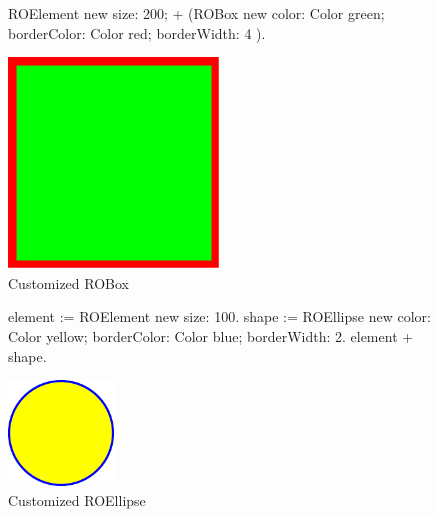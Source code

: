 \documentclass[a4paper,10pt,twoside]{book}
\begin{document}
\begin{figure}[H]
      \begin{minipage}[t]{0.5\textwidth}
      \vspace{0pt}
     \begin{code}{}
ROElement new 
	size: 200; 
	+ (ROBox new 
				color: Color green; 
				borderColor: Color red; 
				borderWidth: 4 ).	\end{code}
   \end{minipage}
   \hfill
   \begin{minipage}[t]{0.4\textwidth}
      \vspace{0pt} \raggedright
       \centering
		\includegraphics[width=0.5\textwidth]{box}
   \end{minipage}
\caption{Customized ROBox}
\label{fig:box}
\end{figure} 

\begin{figure}[H]
      \begin{minipage}[t]{0.5\textwidth}
      \vspace{0pt}
     \begin{code}{}
element := ROElement new 
				size: 100.
shape := ROEllipse new 
			color: Color yellow; 
			borderColor: Color blue; 
			borderWidth: 2.
element + shape.	\end{code}
   \end{minipage}
   \hfill
   \begin{minipage}[t]{0.4\textwidth}
      \vspace{0pt} \raggedright
       \centering
		\includegraphics[width=0.25\textwidth]{circle}     
   \end{minipage}
\caption{Customized ROEllipse}
\label{fig:circle}
\end{figure}
\end{document}
